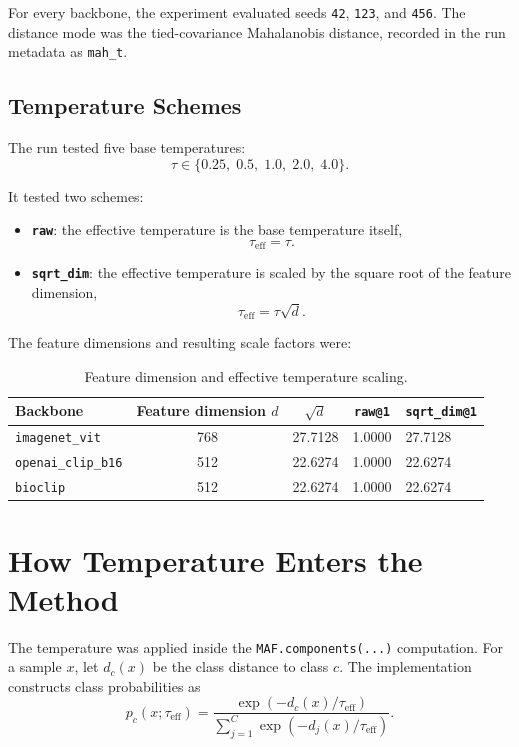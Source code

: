 \documentclass[11pt]{article}
\begin{document}
For every backbone, the experiment evaluated seeds \texttt{42}, \texttt{123}, and \texttt{456}. The distance mode was the tied-covariance Mahalanobis distance, recorded in the run metadata as \texttt{mah\_t}.

\subsection{Temperature Schemes}

The run tested five base temperatures:
\[
\tau \in \{0.25,\;0.5,\;1.0,\;2.0,\;4.0\}.
\]

It tested two schemes:
\begin{itemize}
  \item \textbf{\texttt{raw}}: the effective temperature is the base temperature itself,
  \[
  \tau_{\mathrm{eff}} = \tau.
  \]
  \item \textbf{\texttt{sqrt\_dim}}: the effective temperature is scaled by the square root of the feature dimension,
  \[
  \tau_{\mathrm{eff}} = \tau \sqrt{d}.
  \]
\end{itemize}

The feature dimensions and resulting scale factors were:

\begin{table}[h]
\centering
\small
\begin{tabular}{lcccl}
\toprule
Backbone & Feature dimension $d$ & $\sqrt{d}$ & \texttt{raw@1} & \texttt{sqrt\_dim@1} \\
\midrule
\texttt{imagenet\_vit} & 768 & 27.7128 & 1.0000 & 27.7128 \\
\texttt{openai\_clip\_b16} & 512 & 22.6274 & 1.0000 & 22.6274 \\
\texttt{bioclip} & 512 & 22.6274 & 1.0000 & 22.6274 \\
\bottomrule
\end{tabular}
\caption{Feature dimension and effective temperature scaling.}
\end{table}

\section{How Temperature Enters the Method}

The temperature was applied inside the \texttt{MAF.components(...)} computation. For a sample $x$, let $d_c(x)$ be the class distance to class $c$. The implementation constructs class probabilities as
\[
p_c(x;\tau_{\mathrm{eff}}) =
\frac{\exp\left(-d_c(x) / \tau_{\mathrm{eff}}\right)}
{\sum_{j=1}^{C} \exp\left(-d_j(x) / \tau_{\mathrm{eff}}\right)}.
\]
\end{document}
